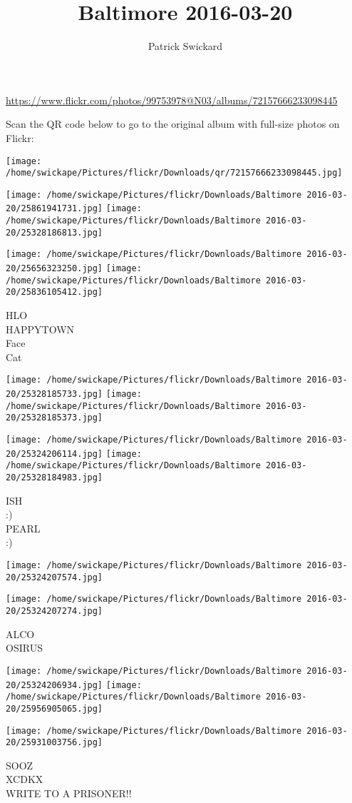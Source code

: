 \documentclass[10pt,letterpaper]{article}
\title{Baltimore 2016-03-20}
\author{Patrick Swickard}
\date{}
\begin{document}
\maketitle

\url{https://www.flickr.com/photos/99753978@N03/albums/72157666233098445}

Scan the QR code below to go to the original album with full-size photos on Flickr:

\texttt{[image: /home/swickape/Pictures/flickr/Downloads/qr/72157666233098445.jpg]}
\pagebreak

\texttt{[image: /home/swickape/Pictures/flickr/Downloads/Baltimore 2016-03-20/25861941731.jpg]}
\texttt{[image: /home/swickape/Pictures/flickr/Downloads/Baltimore 2016-03-20/25328186813.jpg]}

\texttt{[image: /home/swickape/Pictures/flickr/Downloads/Baltimore 2016-03-20/25656323250.jpg]}
\texttt{[image: /home/swickape/Pictures/flickr/Downloads/Baltimore 2016-03-20/25836105412.jpg]}

HLO\\
HAPPYTOWN\\
Face\\
Cat
\pagebreak

\texttt{[image: /home/swickape/Pictures/flickr/Downloads/Baltimore 2016-03-20/25328185733.jpg]}
\texttt{[image: /home/swickape/Pictures/flickr/Downloads/Baltimore 2016-03-20/25328185373.jpg]}

\texttt{[image: /home/swickape/Pictures/flickr/Downloads/Baltimore 2016-03-20/25324206114.jpg]}
\texttt{[image: /home/swickape/Pictures/flickr/Downloads/Baltimore 2016-03-20/25328184983.jpg]}

ISH\\
:)\\
PEARL\\
:)
\pagebreak

\texttt{[image: /home/swickape/Pictures/flickr/Downloads/Baltimore 2016-03-20/25324207574.jpg]}

\vspace{0.25in}
\texttt{[image: /home/swickape/Pictures/flickr/Downloads/Baltimore 2016-03-20/25324207274.jpg]}

ALCO\\
OSIRUS
\pagebreak

\texttt{[image: /home/swickape/Pictures/flickr/Downloads/Baltimore 2016-03-20/25324206934.jpg]}
\texttt{[image: /home/swickape/Pictures/flickr/Downloads/Baltimore 2016-03-20/25956905065.jpg]}

\texttt{[image: /home/swickape/Pictures/flickr/Downloads/Baltimore 2016-03-20/25931003756.jpg]}

SOOZ\\
XCDKX\\
WRITE TO A PRISONER!!
\pagebreak
\end{document}
